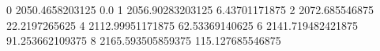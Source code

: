 0 2050.4658203125 0.0
1 2056.90283203125 6.43701171875
2 2072.685546875 22.2197265625
4 2112.99951171875 62.53369140625
6 2141.719482421875 91.253662109375
8 2165.593505859375 115.127685546875
